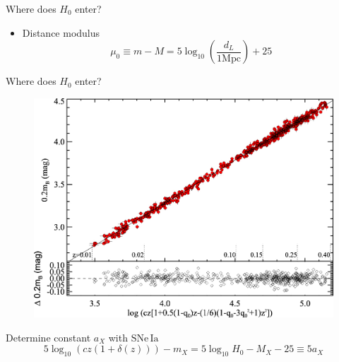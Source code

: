 \documentclass{beamer}
\newcommand{\SNe}{\mathrm{SNe\,Ia}}
\begin{document}
\begin{frame}{Where does $H_0$ enter?}
\begin{itemize}
\item[] Distance modulus
\begin{equation*}
\mu_0 \equiv m - M = 5 \log_{10} \left(\frac{d_L}{1 \mathrm{Mpc}} \right) + 25 \,  \label{Eq:distance-modulus}
\end{equation*}%
\end{itemize}
\end{frame}


\begin{frame}{Where does $H_0$ enter?}
\begin{figure}[hbtp]
\centering
\includegraphics[scale=0.8]{../figures/chapter-h0/Hubble-diagram.jpg}
\end{figure}

Determine constant $a_X$ with $\SNe$
\begin{equation*}\label{Eq:av-definition}
5 \log_{10} ( c z ( 1+\delta(z) )) - m_X = 5 \log_{10} H_0 - M_X - 25 \equiv 5 a_X 
\end{equation*}
\end{frame}
\end{document}
